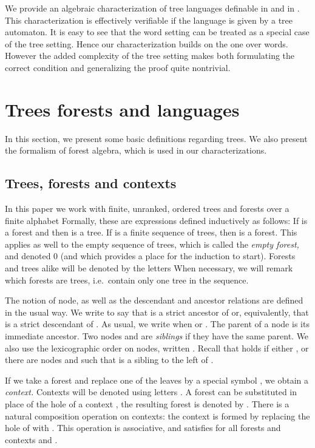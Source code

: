 \documentclass{LMCS}
\begin{document}
We provide an algebraic characterization of tree languages definable in \Dtwo
and in \Dtwol. This characterization is effectively verifiable if the language
is given by a tree automaton. It is easy to see that the word setting can be
treated as a special case of the tree setting. Hence our characterization
builds on the one over words.  However the added complexity of the tree setting
makes both formulating the correct condition and generalizing the proof quite
nontrivial.


\section{Trees forests and languages}
In this section, we present some basic definitions regarding trees. We also present the formalism of forest algebra, which is used in  our characterizations.


\subsection{Trees, forests and contexts}
In this paper we work with finite, unranked, ordered trees and forests
over a finite alphabet  Formally, these are expressions defined
inductively as follows: If  is a forest and  then  is
a tree.  If  is a finite sequence of trees, then
 is a forest.  This applies as well to the empty
sequence of trees, which is called the {\it empty forest,} and denoted
0 (and which provides a place for the induction to start).  Forests
and trees alike will be denoted by the letters  When
necessary, we will  remark which forests are trees, i.e.~contain
only one tree in the sequence.



The notion of node, as well as the descendant and ancestor relations are
defined in the usual way. We write  to say that  is a strict ancestor of
 or, equivalently, that  is a strict descendant of . As usual, we
write  when  or .  The parent of a node  is its
immediate ancestor. Two nodes  and  are \emph{siblings} if they have the
same parent.  We also use the lexicographic order on nodes, written .
Recall that  holds if either , or there are nodes 
and  such that  is a sibling to the left of .

If we take a forest and replace one of the leaves by a special symbol
, we obtain a \emph{context.}  Contexts will be denoted
using letters . A forest  can be substituted in place of the
hole of a context , the resulting forest is denoted by .
 There is a natural composition operation on contexts: the
context  is formed by replacing the hole of  with .
This operation is associative, and satisfies  for all
forests  and contexts  and .
\end{document}
